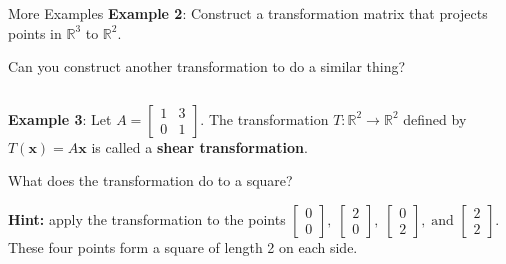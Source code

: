\documentclass[10pt, aspectratio=169]{beamer}
\begin{document}
\begin{frame}{More Examples}
    \textbf{Example 2}: Construct a transformation matrix that projects points in \(\mathbb{R}^3\) to \(\mathbb{R}^2\).

    Can you construct another transformation to do a similar thing?
    \begin{columns}
        \begin{column}{0.7\textwidth}
            \textbf{Example 3}: Let \(A = 
            \begin{bmatrix}
                1 & 3\\
                0 & 1
            \end{bmatrix}.\)
            The transformation \(T:\mathbb{R}^2 \to \mathbb{R}^2\) defined by \(T(\mathbf{x}) = A\mathbf{x}\) is called a \textbf{shear transformation}.

            What does the transformation do to a square?

            \textbf{Hint:} apply the transformation to the points 
            \(
            \left[\begin{array}{c} 0 \\0 \end{array}\right], \; 
            \left[\begin{array}{c} 2 \\0 \end{array}\right], \;
            \left[\begin{array}{c} 0 \\2 \end{array}\right], \; \text{and }
            \left[\begin{array}{c} 2 \\2 \end{array}\right]
            \). These four points form a square of length 2 on each side.

        \end{column}


\end{columns}
\end{frame}
\end{document}
